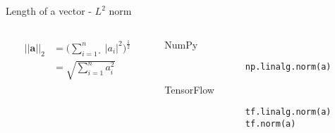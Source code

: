\documentclass[handout]{beamer}
\begin{document}
\begin{frame}[fragile]{Length of a vector - $L^2$ norm}
    \begin{columns}
        \begin{column}{0.5\textwidth}
        \huge
            \begin{align*}
                ||\boldsymbol{a}||_2 &= \Bigg( \sum^{n}_{i=1}̣ |a_i|^2\Bigg)^\frac{1}{2}\\
                                     &= \sqrt{\sum^{n}_{i=1} a_i^2}
            \end{align*}
        \end{column}
        \begin{column}{0.5\textwidth}
            \begin{alertblock}{NumPy}
                \begin{lstlisting}
                np.linalg.norm(a)
                \end{lstlisting}
            \end{alertblock}
            \begin{alertblock}{TensorFlow}
                \begin{lstlisting}
                tf.linalg.norm(a)
                tf.norm(a)
                \end{lstlisting}
            \end{alertblock}
        \end{column}
    \end{columns}
\end{frame}
\end{document}
